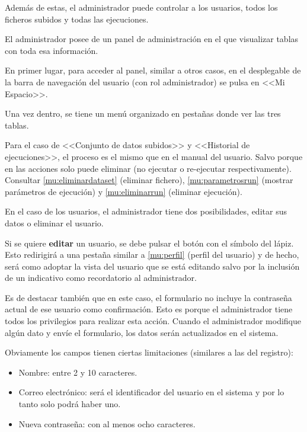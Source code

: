 Además de estas, el administrador puede controlar a los usuarios, todos los
ficheros subidos y todas las ejecuciones.

El administrador posee de un panel de administración en el que visualizar tablas
con toda esa información.

En primer lugar, para acceder al panel, similar a otros casos, en el desplegable
de la barra de navegación del usuario (con rol administrador) se pulsa en <<Mi
Espacio>>.


Una vez dentro, se tiene un menú organizado en pestañas donde ver las tres tablas.




Para el caso de <<Conjunto de datos subidos>> y <<Historial de ejecuciones>>, el
proceso es el mismo que en el manual del usuario. Salvo porque en las acciones
solo puede eliminar (no ejecutar o re-ejecutar respectivamente). Consultar
\ref{mu:eliminardataset} (eliminar fichero), \ref{mu:parametrosrun} (mostrar
parámetros de ejecución) y \ref{mu:eliminarrun} (eliminar ejecución).

En el caso de los usuarios, el administrador tiene dos posibilidades, editar sus
datos o eliminar el usuario.

Si se quiere \textbf{editar} un usuario, se debe pulsar el botón con el símbolo
del lápiz. Esto redirigirá a una pestaña similar a \ref{mu:perfil} (perfil del
usuario) y de hecho, será como adoptar la vista del usuario que se está editando
salvo por la inclusión de un indicativo como recordatorio al administrador.


Es de destacar también que en este caso, el formulario no incluye la contraseña
actual de ese usuario como confirmación. Esto es porque el administrador tiene
todos los privilegios para realizar esta acción. Cuando el administrador
modifique algún dato y envíe el formulario, los datos serán actualizados en el
sistema. 

Obviamente los campos tienen ciertas limitaciones (similares a las del
registro):
\begin{itemize}
    \item Nombre: entre 2 y 10 caracteres.
    \item Correo electrónico: será el identificador del usuario en el sistema y
    por lo tanto solo podrá haber uno.
    \item Nueva contraseña: con al menos ocho caracteres.
\end{itemize}

